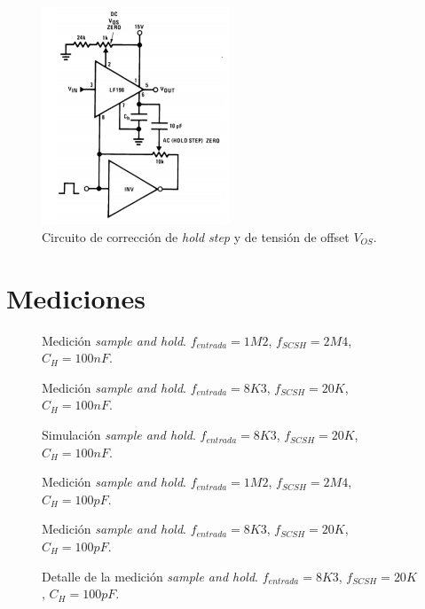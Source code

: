 \documentclass[../../ASSD_TP1_G7.tex]{subfiles}
\begin{document}
		\begin{figure}[H]
			\centering
			\includegraphics[width = 0.5\textwidth]{figures/offset_adjust_schematic.png}
			\caption{Circuito de correcci\'on de \textit{hold step} y de tensi\'on de offset $V_{OS}$.}
			\label{fig:syh_offset_correction_datasheet}
		\end{figure}	
		

\section{Mediciones}

\begin{figure}[H]
	\centering
	
	\caption{Medici\'on \textit{sample and hold}. $f_{entrada} = 1M2$, $f_{SCSH}=2M4$, $C_H = 100nF$.}
\end{figure}

\begin{figure}[H]
	\centering
	
	\caption{Medici\'on \textit{sample and hold}. $f_{entrada} = 8K3$, $f_{SCSH}=20K$, $C_H = 100nF$.}
\end{figure}

\begin{figure}[H]
	\centering
	
	\caption{Simulaci\'on \textit{sample and hold}. $f_{entrada} = 8K3$, $f_{SCSH}=20K$, $C_H = 100nF$.}
\end{figure}


\begin{figure}[H]
	\centering
	
	\caption{Medici\'on \textit{sample and hold}. $f_{entrada} = 1M2$, $f_{SCSH}=2M4$, $C_H = 100pF$.}
\end{figure}

\begin{figure}[H]
	\centering
	
	\caption{Medici\'on \textit{sample and hold}. $f_{entrada} = 8K3$, $f_{SCSH}=20K$, $C_H = 100pF$.}
\end{figure}

\begin{figure}[H]
	\centering
	
	\caption{Detalle de la medici\'on \textit{sample and hold}. $f_{entrada} = 8K3$, $f_{SCSH}=20K$, $C_H = 100pF$.}
\end{figure}
\end{document}
